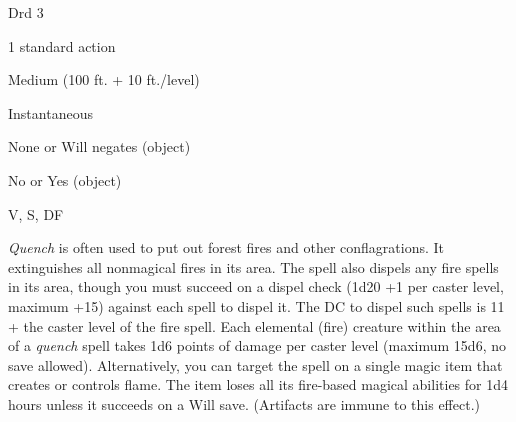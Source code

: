 
\begin{description*}
\item[Level:] Drd 3
\item[Casting Time:] 1 standard action
\item[Range:] Medium (100 ft. + 10 ft./level)
\item[Duration:] Instantaneous
\item[Saving Throw:] None or Will negates (object)
\item[Spell Resistance:] No or Yes (object)
\item[Components:] V, S, DF
\end{description*}

\textit{Quench} is often used to put out forest fires and other conflagrations.
It extinguishes all nonmagical fires in its area. The spell also dispels any fire
spells in its area, though you must succeed on a dispel check (1d20 +1 per caster
level, maximum +15) against each spell to dispel it. The DC to dispel such spells
is 11 + the caster level of the fire spell.
Each elemental (fire) creature within the area of a \textit{quench} spell takes
1d6 points of damage per caster level (maximum 15d6, no save allowed).
Alternatively, you can target the spell on a single magic item that creates or
controls flame. The item loses all its fire-based magical abilities for
1d4 hours unless it succeeds on a Will save. (Artifacts are immune to this effect.)